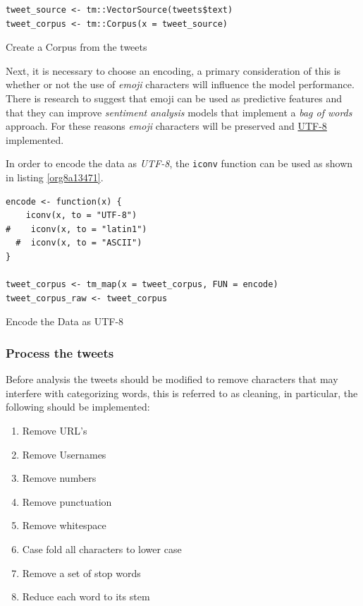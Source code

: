 \documentclass[11pt]{article}
\begin{document}
\begin{listing}[htbp]
\begin{verbatim}
tweet_source <- tm::VectorSource(tweets$text)
tweet_corpus <- tm::Corpus(x = tweet_source)
\end{verbatim}
\caption{\label{org12a0aed}Create a Corpus from the tweets}
\end{listing}

Next, it is necessary to choose an encoding, a primary consideration of this is whether or not the use of \emph{emoji} characters will influence the model performance. There is research to suggest that emoji can be used as predictive features \cite{lecompte2017} and that they can improve \emph{sentiment analysis} models \cite{shiha2017} that implement a \emph{bag of words} approach. For these reasons \emph{emoji} characters will be preserved and \href{http://www.utf-8.com/}{UTF-8} implemented.

In order to encode the data as \emph{UTF-8}, the \texttt{iconv} function can be used as shown in listing \ref{org8a13471}.

\begin{listing}[htbp]
\begin{verbatim}
encode <- function(x) {
    iconv(x, to = "UTF-8")
#    iconv(x, to = "latin1")
  #  iconv(x, to = "ASCII")
}

tweet_corpus <- tm_map(x = tweet_corpus, FUN = encode)
tweet_corpus_raw <- tweet_corpus
\end{verbatim}
\caption{\label{org8a13471}Encode the Data as UTF-8}
\end{listing}

\subsubsection{Process the tweets}
\label{sec:org21a7982}
Before analysis the tweets should be modified to remove characters that may interfere with categorizing words, this is referred to as cleaning, in particular, the following should be implemented:

\begin{enumerate}
\item Remove URL's
\item Remove Usernames
\item Remove numbers
\item Remove punctuation
\item Remove whitespace
\item Case fold all characters to lower case
\item Remove a set of stop words
\item Reduce each word to its stem
\end{enumerate}
\end{document}
